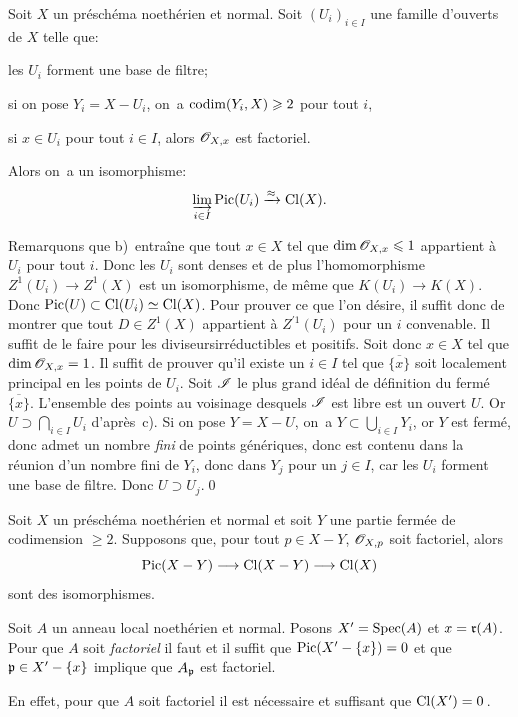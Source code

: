 \begin{propositionblah} \label{XI.3.7.1}
Soit $X$ un pr\'esch\'ema noeth\'erien et normal. Soit $(U_i)_{i\in I}$ une famille d'ouverts de $X$ telle que:
\begin{enumeratea}
\item
les $U_i$ forment une base de filtre;
\item
si on pose $Y_i=X-U_i$, on~a $\operatorname{codim}(Y_i, X)\geqslant 2$ pour tout $i$,
\item
si $x\in U_i$ pour tout $i\in I$, alors $\mathscr{O}_{X, x}$ est factoriel.
\end{enumeratea}
\noindent
Alors on~a un isomorphisme:
\[
\varinjlim_{i\in I}\operatorname{Pic}(U_i)\xrightarrow{\approx}\operatorname{Cl}(X){}.
\]
\end{propositionblah} Remarquons que b)~entra\^ine que tout $x\in X$ tel que $\dim\mathscr{O}_{X, x}\leqslant 1$ appartient \`a $U_i$ pour tout $i$. Donc les $U_i$ sont denses et de plus l'homomorphisme $Z^1(U_i)\to Z^1(X)$ est un isomorphisme, de m\^eme que $K(U_i)\to K(X)$. Donc $\operatorname{Pic}(U)\subset \operatorname{Cl}(U_i) \simeq \operatorname{Cl}(X)$. Pour prouver ce que l'on d\'esire, il suffit donc de montrer que tout $D\in Z^1(X)$ appartient \`a $Z^{\prime1}(U_i)$ pour un $i$ convenable. Il suffit de le faire pour les \og diviseurs\fg irr\'eductibles et positifs. Soit donc $x\in X$ tel que $\dim\mathscr{O}_{X, x}=1$. Il suffit de prouver qu'il existe un $i\in I$ tel que $\overline{\{x\}}$ soit localement principal en les points de $U_i$. Soit ${\mathscr I}$ le plus grand id\'eal de d\'efinition du ferm\'e $\overline{\{x\}}$. L'ensemble des points au voisinage desquels ${\mathscr I}$ est libre est un ouvert $U$. Or $U\supset \bigcap_{i\in I}U_i$ d'apr\`es~c). Si on pose $Y=X-U$, on~a $Y\subset \bigcup_{i\in I}Y_i$, or $Y$ est ferm\'e, donc admet un nombre \emph{fini} de points g\'en\'eriques, donc est contenu dans la r\'eunion d'un nombre fini de $Y_i$, donc dans $Y_j$ pour un $j\in I$, car les $U_i$ forment une base de filtre. Donc $U\supset U_j$.\qed

\begin{corollaire} \label{XI.3.8}
Soit $X$ un pr\'esch\'ema noeth\'erien et normal et soit $Y$ une partie ferm\'ee de codimension $\geq 2$. Supposons que, pour tout $p\in X-Y$, ${\mathscr O}_{X, p}$ soit factoriel, alors
\[
\Pic(X-Y)\to\Cl(X-Y)\to\Cl(X)
\]
sont des isomorphismes.
\end{corollaire}

\begin{corollaire} \label{XI.3.9}
Soit $A$ un anneau local noeth\'erien et normal. Posons $X'=\operatorname{Spec}(A)$ et $x = \mathfrak{r}(A)$. Pour que $A$ soit \emph{factoriel} il faut et il suffit que $\operatorname{Pic}(X'-\{x\})=0$ et que $\mathfrak{p}\in X'-\{x\}$ implique que $A_{\mathfrak{p}}$ est factoriel.
\end{corollaire}
En effet, pour que $A$ soit factoriel il est n\'ecessaire et suffisant que $\operatorname{Cl}(X')=0$\,.

